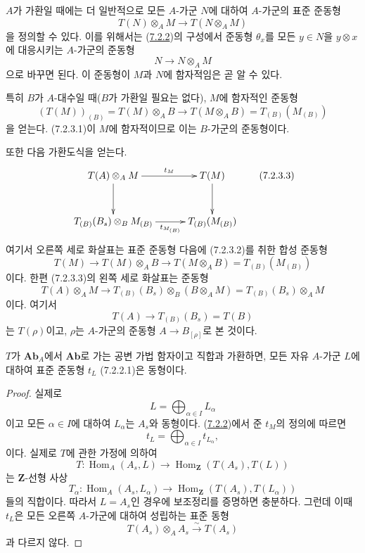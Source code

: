 \begin{env}[7.2.3]
\label{III.7.2.3-fr}
$A$가 가환일 때에는 더 일반적으로 모든 $A$-가군 $N$에 대하여
$A$-가군의 표준 준동형
\[
  T(N)\otimes_A M\longrightarrow T(N\otimes_A M)
  \tag{7.2.3.1}\label{III.7.2.3.1.fr}
\]
을 정의할 수 있다. 이를 위해서는 (\hyperref[III.7.2.2-fr]{7.2.2})의
구성에서 준동형 $\theta_x$를 모든 $y\in N$을 $y\otimes x$에 대응시키는
$A$-가군의 준동형
\[
  N\longrightarrow N\otimes_A M
\]
으로 바꾸면 된다. 이 준동형이 $M$과 $N$에 함자적임은 곧 알 수 있다.

특히 $B$가 $A$-대수일 때($B$가 가환일 필요는 없다), $M$에 함자적인
준동형
\[
  (T(M))_{(B)}
  =
  T(M)\otimes_A B
  \longrightarrow
  T(M\otimes_A B)
  =
  T_{(B)}(M_{(B)})
  \tag{7.2.3.2}\label{III.7.2.3.2.fr}
\]
을 얻는다. (7.2.3.1)이 $M$에 함자적이므로 이는 $B$-가군의
준동형이다.

또한 다음 가환도식을 얻는다.
\[
\xymatrix@C=30pt@R=30pt{
  T(A)\otimes_A M
  \ar[r]^-{t_M}\ar[d]
  &
  T(M)\ar[d]
  \\
  T_{(B)}(B_s)\otimes_B M_{(B)}
  \ar[r]_-{t_{M_{(B)}}}
  &
  T_{(B)}(M_{(B)})
}
\tag{7.2.3.3}\label{III.7.2.3.3.fr}
\]
여기서 오른쪽 세로 화살표는 표준 준동형 다음에 (7.2.3.2)를 취한 합성
준동형
\[
  T(M)
  \longrightarrow
  T(M)\otimes_A B
  \longrightarrow
  T(M\otimes_A B)
  =
  T_{(B)}(M_{(B)})
\]
이다. 한편 (7.2.3.3)의 왼쪽 세로 화살표는 준동형
\[
  T(A)\otimes_A M
  \longrightarrow
  T_{(B)}(B_s)\otimes_B(B\otimes_A M)
  =
  T_{(B)}(B_s)\otimes_A M
\]
이다. 여기서
\[
  T(A)\longrightarrow T_{(B)}(B_s)=T(B)
\]
는 $T(\rho)$이고, $\rho$는 $A$-가군의 준동형
$A\to B_{[\rho]}$로 본 것이다.
\end{env}

\begin{lemma}[7.2.4]
\label{III.7.2.4-fr}
$T$가 $\mathbf{Ab}_A$에서 $\mathbf{Ab}$로 가는 공변 가법 함자이고
직합과 가환하면, 모든 자유 $A$-가군 $L$에 대하여 표준 준동형
$t_L$ (7.2.2.1)은 동형이다.
\end{lemma}

\begin{proof}
실제로
\[
  L=\bigoplus_{\alpha\in I}L_\alpha
\]
이고 모든 $\alpha\in I$에 대하여 $L_\alpha$는 $A_s$와 동형이다.
(\hyperref[III.7.2.2-fr]{7.2.2})에서 준 $t_M$의 정의에 따르면
\[
  t_L=\bigoplus_{\alpha\in I}t_{L_\alpha},
\]
이다. 실제로 $T$에 관한 가정에 의하여
\[
  T:
  \operatorname{Hom}_A(A_s,L)
  \longrightarrow
  \operatorname{Hom}_{\mathbf Z}(T(A_s),T(L))
\]
는 $\mathbf Z$-선형 사상
\[
  T_\alpha:
  \operatorname{Hom}_A(A_s,L_\alpha)
  \longrightarrow
  \operatorname{Hom}_{\mathbf Z}(T(A_s),T(L_\alpha))
\]
들의 직합이다. 따라서 $L=A_s$인 경우에 보조정리를 증명하면
충분하다. 그런데 이때 $t_L$은 모든 오른쪽 $A$-가군에 대하여
성립하는 표준 동형
\[
  T(A_s)\otimes_A A_s\xrightarrow{\sim}T(A_s)
\]
과 다르지 않다.
\end{proof}

